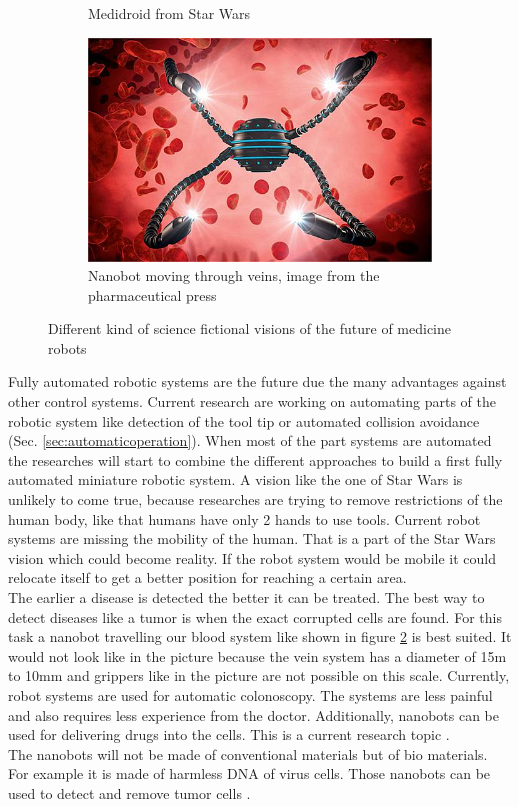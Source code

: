 \begin{figure}[H]
\begin{subfigure}[b]{0.2\textwidth}
        \caption{Medidroid from Star Wars \cite{medidroid}}
        \label{fig:medidroid}
    \end{subfigure}
    \qquad
    \qquad
    \begin{subfigure}[b]{0.3\textwidth}
        \includegraphics[width=\textwidth]{Figures/nanobot.jpg}
        \caption{Nanobot moving through veins, image from the pharmaceutical press \cite{nanobot}}
        \label{fig:nanobot}
    \end{subfigure}
    \caption{Different kind of science fictional visions of the future of medicine robots}
    \label{fig:visions}
\end{figure}
Fully automated robotic systems are the future due the many advantages against other control systems. Current research are working on automating parts of the robotic system like detection of the tool tip or automated collision avoidance (Sec. \ref{sec:automaticoperation}). When most of the part systems are automated the researches will start to combine the different approaches to build a first fully automated miniature robotic system. A vision like the one of Star Wars is unlikely to come true, because researches are trying to remove restrictions of the human body, like that humans have only 2 hands to use tools. Current robot systems are missing the mobility of the human. That is a part of the Star Wars vision which could become reality. If the robot system would be mobile it could relocate itself to get a better position for reaching a certain area.\\
The earlier a disease is detected the better it can be treated. The best way to detect diseases like a tumor is when the exact corrupted cells are found. For this task a nanobot travelling our blood system like shown in figure \ref{fig:nanobot} is best suited. It would not look like in the picture because the vein system has a diameter of 15\textmu m to 10mm and grippers like in the picture are not possible on this scale. Currently, robot systems are used for automatic colonoscopy. The systems are less painful and also requires less experience from the doctor\cite{automatedColonoscopy}. Additionally, nanobots can be used for delivering drugs into the cells. This is a current research topic \cite{automatedDrugDelivery}. \\ 
The nanobots will not be made of conventional materials but of bio materials. For example it is made of harmless DNA of virus cells. Those nanobots can be used to detect and remove tumor cells \cite{nanobotsOfVirusDNA}. \\